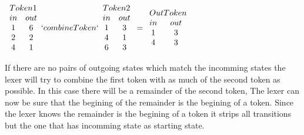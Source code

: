 \begin{example}\label{combTok}
\mbox{}\\
\begin{center}$\begin{array}{cc}
\multicolumn{2}{c}{Token 1}\\
in & out\\
1 & 6\\
2 & 2\\
4 & 1\\
\end{array}
`combineToken`
\begin{array}{cc}\multicolumn{2}{c}{Token 2}\\
in & out\\
1 & 3\\
4 & 1\\
6 & 3\\
\end{array}
=
\begin{array}{cc}\multicolumn{2}{c}{Out Token}\\
in & out\\
1 & 3\\
4 & 3\\
\end{array}$
\end{center}
\end{example}
If there are no pairs of outgoing states which match the incomming states the
lexer will try to combine the first token with as much of the second token as
possible. In this case there will be a remainder of the second token, The lexer
can now be sure that the begining of the remainder is the begining of a token.
Since the lexer knows the remainder is the begining of a token it strips all
transitions but the one that has incomming state as starting state.
